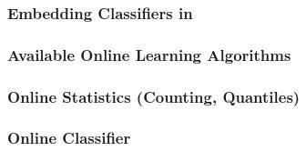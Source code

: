 \subsubsection{Embedding Classifiers in \streams}


\subsubsection{Available Online Learning Algorithms}

\subsubsection*{Online Statistics (Counting, Quantiles)}

\subsubsection*{Online Classifier}





